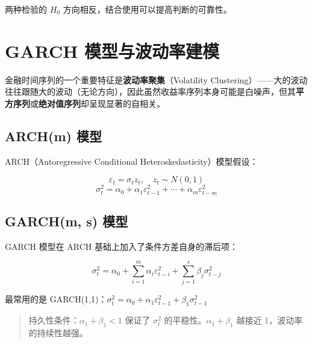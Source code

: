 \documentclass[
]{book}
\begin{document}
两种检验的 \(H_0\) 方向相反，结合使用可以提高判断的可靠性。

\section{GARCH 模型与波动率建模}\label{garch-ux6a21ux578bux4e0eux6ce2ux52a8ux7387ux5efaux6a21}

金融时间序列的一个重要特征是\textbf{波动率聚集}（Volatility Clustering）------大的波动往往跟随大的波动（无论方向），因此虽然收益率序列本身可能是白噪声，但其\textbf{平方序列}或\textbf{绝对值序列}却呈现显著的自相关。

\subsection{ARCH(m) 模型}\label{archm-ux6a21ux578b}

ARCH（Autoregressive Conditional Heteroskedasticity）模型假设：

\[\varepsilon_t = \sigma_t z_t, \quad z_t \sim N(0, 1)\]
\[\sigma_t^2 = \alpha_0 + \alpha_1 \varepsilon_{t-1}^2 + \cdots + \alpha_m \varepsilon_{t-m}^2\]

\subsection{GARCH(m, s) 模型}\label{garchm-s-ux6a21ux578b}

GARCH 模型在 ARCH 基础上加入了条件方差自身的滞后项：

\[\sigma_t^2 = \alpha_0 + \sum_{i=1}^m \alpha_i \varepsilon_{t-i}^2 + \sum_{j=1}^s \beta_j \sigma_{t-j}^2\]

最常用的是 GARCH(1,1)：\(\sigma_t^2 = \alpha_0 + \alpha_1 \varepsilon_{t-1}^2 + \beta_1 \sigma_{t-1}^2\)

\begin{quote}
持久性条件：\(\alpha_1 + \beta_1 < 1\) 保证了 \(\sigma_t^2\) 的平稳性。\(\alpha_1 + \beta_1\) 越接近 1，波动率的持续性越强。
\end{quote}
\end{document}
